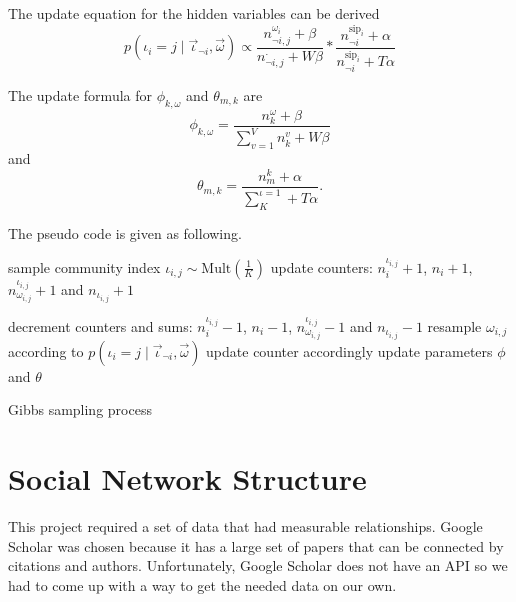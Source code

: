 \documentclass[letterpaper]{article}
\begin{document}
The update equation for the hidden variables can be derived
\begin{equation}
p( \iota_{i} = j \mid \vec{\iota}_{\neg i}, \vec{\omega}) \propto 
\frac{ n^{\omega_{i}}_{\neg i, j}+\beta }{ n^{\cdot}_{\neg i, j}+W\beta } \ast \frac{ n^{\mbox{sip}_{i}}_{\neg i}+\alpha }{ n^{\mbox{sip}_{i}}_{\neg i}+T\alpha }
\end{equation}

The update formula for $ \phi_{k,\omega} $ and $ \theta_{m,k} $ are
\begin{equation}
\phi_{k,\omega} = \frac{n^{\omega}_{k}+\beta}{\sum_{v=1}^{V}n^{v}_{k}+W\beta}
\end{equation}
and
\begin{equation}
\theta_{m,k} = \frac{n^{k}_{m}+\alpha}{\sum_{K}^{\iota=1}+T\alpha}.
\end{equation}

The pseudo code is given as following.
\begin{algorithm}
	\begin{algorithmic}[1]
		\State sample community index $ \iota_{i,j} \sim \mbox{Mult}(\frac{1}{K}) $
		\State update counters: $ n^{\iota_{i,j}}_{i} + 1 $, $ n_{i} + 1 $, $ n^{\iota_{i,j}}_{\omega_{i,j}} +1 $ and $ n_{\iota_{i,j}} +1 $
		\EndFor
		\EndFor
		
		\State decrement counters and sums:  $ n^{\iota_{i,j}}_{i} - 1 $, $ n_{i} - 1 $, $ n^{\iota_{i,j}}_{\omega_{i,j}} - 1 $ and $ n_{\iota_{i,j}} - 1 $ 
		\State resample $ \omega_{i,j} $ according to  $ p(\iota_{i}=j \mid \vec{\iota}_{\neg i}, \vec{\omega} ) $
		\State update counter accordingly
		\EndFor
		\EndFor
		\State update parameters $ \phi $ and $ \theta $
		\EndIf
		\EndWhile
	\end{algorithmic}
	\caption{Gibbs sampling process}
\end{algorithm}


\section{Social Network Structure}

This project required a set of data that had measurable relationships.
Google Scholar was chosen because it has a large set of papers that can be connected by citations and authors.
Unfortunately, Google Scholar does not have an API so we had to come up with a way to get the needed data on our own.
\end{document}
